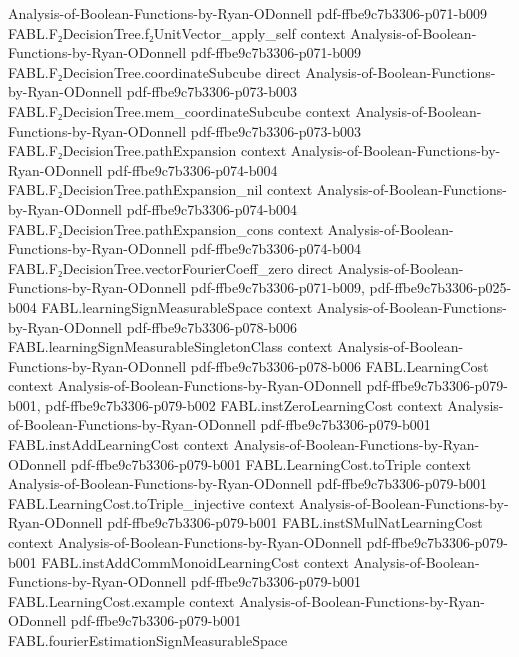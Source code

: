 \begin{theorem}
  {Analysis-of-Boolean-Functions-by-Ryan-ODonnell}
  {pdf-ffbe9c7b3306-p071-b009}
\proofstep
  {FABL.F₂DecisionTree.f₂UnitVector_apply_self}
  {context}
  {Analysis-of-Boolean-Functions-by-Ryan-ODonnell}
  {pdf-ffbe9c7b3306-p071-b009}
\proofstep
  {FABL.F₂DecisionTree.coordinateSubcube}
  {direct}
  {Analysis-of-Boolean-Functions-by-Ryan-ODonnell}
  {pdf-ffbe9c7b3306-p073-b003}
\proofstep
  {FABL.F₂DecisionTree.mem_coordinateSubcube}
  {context}
  {Analysis-of-Boolean-Functions-by-Ryan-ODonnell}
  {pdf-ffbe9c7b3306-p073-b003}
\proofstep
  {FABL.F₂DecisionTree.pathExpansion}
  {context}
  {Analysis-of-Boolean-Functions-by-Ryan-ODonnell}
  {pdf-ffbe9c7b3306-p074-b004}
\proofstep
  {FABL.F₂DecisionTree.pathExpansion_nil}
  {context}
  {Analysis-of-Boolean-Functions-by-Ryan-ODonnell}
  {pdf-ffbe9c7b3306-p074-b004}
\proofstep
  {FABL.F₂DecisionTree.pathExpansion_cons}
  {context}
  {Analysis-of-Boolean-Functions-by-Ryan-ODonnell}
  {pdf-ffbe9c7b3306-p074-b004}
\proofstep
  {FABL.F₂DecisionTree.vectorFourierCoeff_zero}
  {direct}
  {Analysis-of-Boolean-Functions-by-Ryan-ODonnell}
  {pdf-ffbe9c7b3306-p071-b009,
    pdf-ffbe9c7b3306-p025-b004}
\proofstep
  {FABL.learningSignMeasurableSpace}
  {context}
  {Analysis-of-Boolean-Functions-by-Ryan-ODonnell}
  {pdf-ffbe9c7b3306-p078-b006}
\proofstep
  {FABL.learningSignMeasurableSingletonClass}
  {context}
  {Analysis-of-Boolean-Functions-by-Ryan-ODonnell}
  {pdf-ffbe9c7b3306-p078-b006}
\proofstep
  {FABL.LearningCost}
  {context}
  {Analysis-of-Boolean-Functions-by-Ryan-ODonnell}
  {pdf-ffbe9c7b3306-p079-b001,
    pdf-ffbe9c7b3306-p079-b002}
\proofstep
  {FABL.instZeroLearningCost}
  {context}
  {Analysis-of-Boolean-Functions-by-Ryan-ODonnell}
  {pdf-ffbe9c7b3306-p079-b001}
\proofstep
  {FABL.instAddLearningCost}
  {context}
  {Analysis-of-Boolean-Functions-by-Ryan-ODonnell}
  {pdf-ffbe9c7b3306-p079-b001}
\proofstep
  {FABL.LearningCost.toTriple}
  {context}
  {Analysis-of-Boolean-Functions-by-Ryan-ODonnell}
  {pdf-ffbe9c7b3306-p079-b001}
\proofstep
  {FABL.LearningCost.toTriple_injective}
  {context}
  {Analysis-of-Boolean-Functions-by-Ryan-ODonnell}
  {pdf-ffbe9c7b3306-p079-b001}
\proofstep
  {FABL.instSMulNatLearningCost}
  {context}
  {Analysis-of-Boolean-Functions-by-Ryan-ODonnell}
  {pdf-ffbe9c7b3306-p079-b001}
\proofstep
  {FABL.instAddCommMonoidLearningCost}
  {context}
  {Analysis-of-Boolean-Functions-by-Ryan-ODonnell}
  {pdf-ffbe9c7b3306-p079-b001}
\proofstep
  {FABL.LearningCost.example}
  {context}
  {Analysis-of-Boolean-Functions-by-Ryan-ODonnell}
  {pdf-ffbe9c7b3306-p079-b001}
\proofstep
  {FABL.fourierEstimationSignMeasurableSpace}

\end{theorem}
